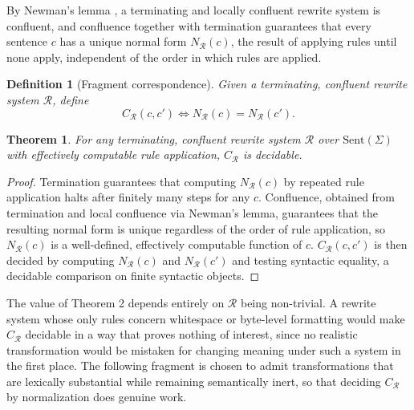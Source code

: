 \documentclass[11pt]{article}
\newtheorem{theorem}{Theorem}
\newtheorem{definition}{Definition}
\begin{document}
By Newman's lemma \cite{newman1942}, a terminating and locally confluent rewrite system is confluent, and confluence together with termination guarantees that every sentence $c$ has a unique normal form $N_{\mathcal{R}}(c)$, the result of applying rules until none apply, independent of the order in which rules are applied.

\begin{definition}[Fragment correspondence]
Given a terminating, confluent rewrite system $\mathcal{R}$, define
\[
C_{\mathcal{R}}(c,c') \iff N_{\mathcal{R}}(c) = N_{\mathcal{R}}(c').
\]
\end{definition}

\begin{theorem}
For any terminating, confluent rewrite system $\mathcal{R}$ over $\mathrm{Sent}(\Sigma)$ with effectively computable rule application, $C_{\mathcal{R}}$ is decidable.
\end{theorem}

\begin{proof}
Termination guarantees that computing $N_{\mathcal{R}}(c)$ by repeated rule application halts after finitely many steps for any $c$. Confluence, obtained from termination and local confluence via Newman's lemma, guarantees that the resulting normal form is unique regardless of the order of rule application, so $N_{\mathcal{R}}(c)$ is a well-defined, effectively computable function of $c$. $C_{\mathcal{R}}(c,c')$ is then decided by computing $N_{\mathcal{R}}(c)$ and $N_{\mathcal{R}}(c')$ and testing syntactic equality, a decidable comparison on finite syntactic objects.
\end{proof}

The value of Theorem 2 depends entirely on $\mathcal{R}$ being non-trivial. A rewrite system whose only rules concern whitespace or byte-level formatting would make $C_{\mathcal{R}}$ decidable in a way that proves nothing of interest, since no realistic transformation would be mistaken for changing meaning under such a system in the first place. The following fragment is chosen to admit transformations that are lexically substantial while remaining semantically inert, so that deciding $C_{\mathcal{R}}$ by normalization does genuine work.
\end{document}
